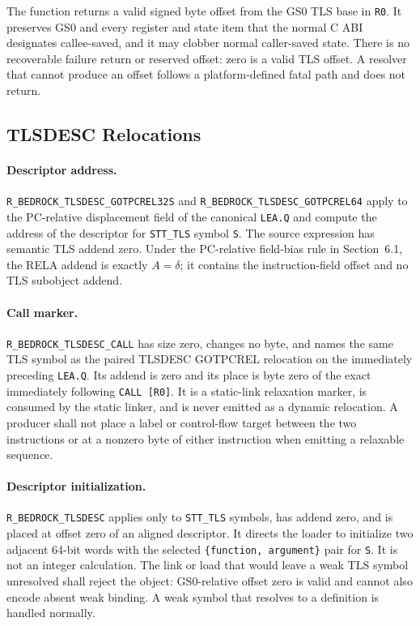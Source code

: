 \documentclass[10pt,twoside]{article}
\begin{document}
The function returns a valid signed byte offset from the GS0 TLS base in
\texttt{R0}. It preserves GS0 and every register and state item that the normal
C ABI designates callee-saved, and it may clobber normal caller-saved state.
There is no recoverable failure return or reserved offset: zero is a valid TLS
offset. A resolver that cannot produce an offset follows a platform-defined
fatal path and does not return.

\subsection{TLSDESC Relocations}
\paragraph{Descriptor address.}
\texttt{R\_BEDROCK\_TLSDESC\_GOTPCREL32S} and
\texttt{R\_BEDROCK\_TLSDESC\_GOTPCREL64} apply to the PC-relative displacement
field of the canonical \texttt{LEA.Q} and compute the address of the descriptor
for \texttt{STT\_TLS} symbol \texttt{S}. The source expression has semantic
TLS addend zero. Under the PC-relative field-bias rule in Section~6.1, the RELA
addend is exactly $A=\delta$; it contains the instruction-field offset and no
TLS subobject addend.

\Needspace{1.0in}
\paragraph{Call marker.}
\texttt{R\_BEDROCK\_TLSDESC\_CALL} has size zero, changes no byte, and names the
same TLS symbol as the paired TLSDESC GOTPCREL relocation on the immediately
preceding \texttt{LEA.Q}. Its addend is zero and its place is byte zero of the
exact immediately following \texttt{CALL [R0]}. It is a static-link relaxation
marker, is consumed by the static linker, and is never emitted as a dynamic
relocation. A producer shall not place a label or control-flow target between
the two instructions or at a nonzero byte of either instruction when emitting
a relaxable sequence.

\paragraph{Descriptor initialization.}
\texttt{R\_BEDROCK\_TLSDESC} applies only to \texttt{STT\_TLS} symbols, has
addend zero, and is placed at offset zero of an aligned descriptor. It directs
the loader to initialize two adjacent 64-bit words with the selected
\texttt{\{function, argument\}} pair for \texttt{S}. It is not an integer
calculation. The link or load that would leave a weak TLS symbol unresolved
shall reject the object: GS0-relative offset zero is valid and cannot also
encode absent weak binding. A weak symbol that resolves to a definition is
handled normally.
\end{document}
